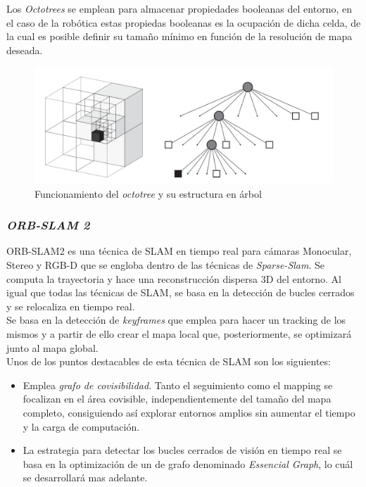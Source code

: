 Los \textit{Octotrees} se emplean para almacenar propiedades booleanas del entorno, en el caso de
la robótica estas propiedas booleanas es la ocupación de dicha celda, de la cual es posible definir su tamaño mínimo en función de la resolución de mapa
deseada.
\begin{figure}[h!]
    \centering
    \includegraphics[width=.7\textwidth]{images/octotree}
    \caption{Funcionamiento del \textit{octotree} y su estructura en árbol}
\end{figure}

\newpage
\subsubsection{\textit{ORB-SLAM 2}}
ORB-SLAM2 es una técnica de SLAM en tiempo real para cámaras Monocular, Stereo y RGB-D que se engloba dentro de las técnicas de 
\textit{Sparse-Slam}. Se computa la trayectoria y hace una reconstrucción dispersa 3D del entorno. Al igual que todas las técnicas 
de SLAM, se basa en la detección de bucles cerrados y  se relocaliza en tiempo real. \\
Se basa en la detección de \textit{keyframes} que emplea para hacer un tracking de los mismos y a partir de ello crear el 
mapa local que, posteriormente, se optimizará junto al mapa global. \\
Unos de los puntos destacables de esta técnica de SLAM son los siguientes:
\begin{itemize}
    \item Emplea \textit{grafo de covisibilidad}. Tanto el seguimiento como el mapping se focalizan en el área covisible,
    independientemente del tamaño del mapa completo, consiguiendo así explorar entornos amplios sin
    aumentar el tiempo y la carga de computación.

    \item La estrategia para detectar los bucles cerrados de visión en tiempo real se basa en la optimización de
   un de grafo denominado \textit{Essencial Graph}, lo cuál se desarrollará mas adelante.
\end{itemize}

